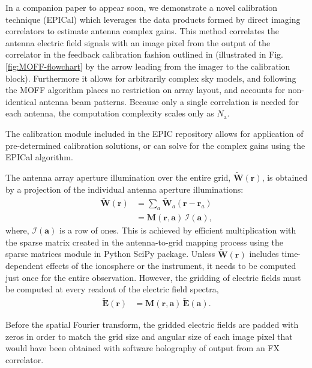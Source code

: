 \documentclass[a4paper,fleqn,usenatbib]{mnras}
\begin{document}
In a companion paper to appear soon, we demonstrate a novel calibration 
technique (EPICal) which leverages the data products formed by direct imaging 
correlators to estimate antenna complex gains. This method correlates the antenna 
electric field signals with an image pixel from the output of the correlator in 
the feedback calibration fashion outlined in \citealt{mor11} (illustrated in Fig. 
\ref{fig:MOFF-flowchart} by the arrow leading from the imager to the calibration 
block). Furthermore it allows for arbitrarily complex sky models, and following 
the MOFF algorithm places no restriction on array layout, and accounts for 
non-identical antenna beam patterns. Because only a single correlation is needed 
for each antenna, the computation complexity scales only as $N_{\mathrm{a}}$. 

The calibration module included in the EPIC repository allows for application of 
pre-determined calibration solutions, or can solve for the complex gains using 
the EPICal algorithm.

\par\medskip
{}
\par\medskip
\noindent The antenna array aperture illumination over the entire grid,
$\widetilde{\mathbf{W}}(\mathbf{r})$, is obtained by a projection of the 
individual antenna aperture illuminations:
\begin{align}\label{eqn:gridding-convolution}
  \widetilde{\mathbf{W}}(\mathbf{r}) &= \sum_a \widetilde{\mathbf{W}}_a(\mathbf{r}-\mathbf{r}_a) \\
                            &= \mathbf{M}(\mathbf{r},\mathbf{a})\,\mathcal{I}(\mathbf{a}),
\end{align}
where, $\mathcal{I}(\mathbf{a})$ is a row of ones. This is achieved by
efficient multiplication with the sparse matrix created in the antenna-to-grid
mapping process using the sparse matrices module in Python SciPy package. 
Unless $\widetilde{\mathbf{W}}(\mathbf{r})$ includes time-dependent
effects of the ionosphere or the instrument, it needs to be computed just once
for the entire observation. However, the gridding of electric fields must be
computed at every readout of the electric field spectra,
\begin{align}
  \widetilde{\mathbf{E}}(\mathbf{r}) &= \mathbf{M}(\mathbf{r},\mathbf{a})\,\widetilde{\mathbf{E}}(\mathbf{a}).
\end{align}

\par\medskip
{}
\par\medskip
\noindent Before the spatial Fourier transform, the gridded electric fields are 
padded with zeros in order to match the grid size and angular size of each image 
pixel that would have been obtained with software holography of output from an FX
correlator. 
\end{document}
